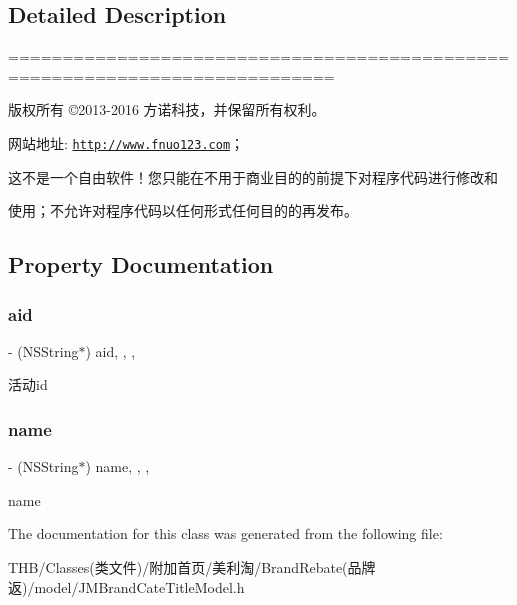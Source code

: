 \subsection{Detailed Description}
============================================================================

版权所有 ©2013-\/2016 方诺科技，并保留所有权利。

网站地址\+: \href{http://www.fnuo123.com}{\tt http\+://www.\+fnuo123.\+com}； 



这不是一个自由软件！您只能在不用于商业目的的前提下对程序代码进行修改和

使用；不允许对程序代码以任何形式任何目的的再发布。 

 

\subsection{Property Documentation}
\mbox{\label{interface_j_m_brand_cate_title_model_aa065be53ecd31387ebd8ca2b4f03534f}} 
\subsubsection{\texorpdfstring{aid}{aid}}
{\footnotesize\ttfamily -\/ (N\+S\+String$\ast$) aid\hspace{0.3cm}{\ttfamily [read]}, {\ttfamily [write]}, {\ttfamily [nonatomic]}, {\ttfamily [copy]}}

活动id \mbox{\label{interface_j_m_brand_cate_title_model_a8266b9927986cc2b6b956c506a822bae}} 
\subsubsection{\texorpdfstring{name}{name}}
{\footnotesize\ttfamily -\/ (N\+S\+String$\ast$) name\hspace{0.3cm}{\ttfamily [read]}, {\ttfamily [write]}, {\ttfamily [nonatomic]}, {\ttfamily [copy]}}

name 

The documentation for this class was generated from the following file\+:\begin{DoxyCompactItemize}
\item 
T\+H\+B/\+Classes(类文件)/附加首页/美利淘/\+Brand\+Rebate(品牌返)/model/J\+M\+Brand\+Cate\+Title\+Model.\+h\end{DoxyCompactItemize}
